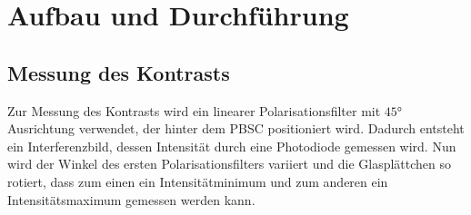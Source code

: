 \newpage
\section{Aufbau und Durchführung}
\label{sec:Durchführung}



\subsection{Messung des Kontrasts}
Zur Messung des Kontrasts wird ein linearer Polarisationsfilter mit $45\si{\degree}$
Ausrichtung verwendet, der hinter dem PBSC positioniert wird.
Dadurch entsteht ein Interferenzbild, dessen Intensität durch eine Photodiode gemessen wird.
Nun wird der Winkel des ersten Polarisationsfilters variiert
und die Glasplättchen so rotiert, dass zum einen ein Intensitätminimum und zum anderen
ein Intensitätsmaximum gemessen werden kann.

